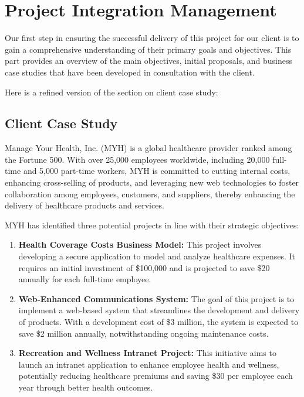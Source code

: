\chapter{Project Integration Management}
Our first step in ensuring the successful delivery of this project for our client is to gain a comprehensive understanding of their primary goals and objectives. This part provides an overview of the main objectives, initial proposals, and business case studies that have been developed in consultation with the client.

Here is a refined version of the section on client case study:

\section{Client Case Study}

Manage Your Health, Inc. (MYH) is a global healthcare provider ranked among the Fortune 500. With over 25,000 employees worldwide, including 20,000 full-time and 5,000 part-time workers, MYH is committed to cutting internal costs, enhancing cross-selling of products, and leveraging new web technologies to foster collaboration among employees, customers, and suppliers, thereby enhancing the delivery of healthcare products and services.

MYH has identified three potential projects in line with their strategic objectives:

\begin{enumerate}[label=\textbf{\arabic*.}]
    \item \textbf{Health Coverage Costs Business Model:} This project involves developing a secure application to model and analyze healthcare expenses. It requires an initial investment of \$100,000 and is projected to save \$20 annually for each full-time employee.
    
    \item \textbf{Web-Enhanced Communications System:} The goal of this project is to implement a web-based system that streamlines the development and delivery of products. With a development cost of \$3 million, the system is expected to save \$2 million annually, notwithstanding ongoing maintenance costs.
    
    \item \textbf{Recreation and Wellness Intranet Project:} This initiative aims to launch an intranet application to enhance employee health and wellness, potentially reducing healthcare premiums and saving \$30 per employee each year through better health outcomes.
\end{enumerate}

